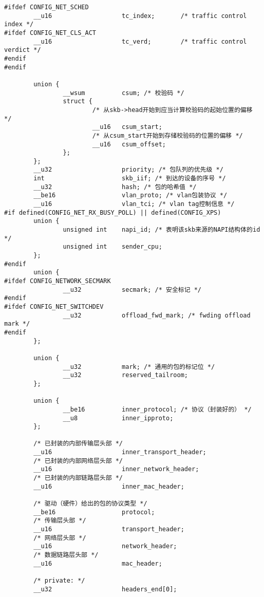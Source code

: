 \documentclass[11pt, a4paper,oneside]{book}
\theoremstyle{ocrenumbox}
\theoremstyle{purplenumbox}
\theoremstyle{blackbox}
\begin{document}
\begin{verbatim}
#ifdef CONFIG_NET_SCHED
        __u16                   tc_index;       /* traffic control index */
#ifdef CONFIG_NET_CLS_ACT
        __u16                   tc_verd;        /* traffic control verdict */
#endif
#endif

        union {
                __wsum          csum; /* 校验码 */
                struct {
                        /* 从skb->head开始到应当计算校验码的起始位置的偏移 */
                        __u16   csum_start; 
                        /* 从csum_start开始到存储校验码的位置的偏移 */
                        __u16   csum_offset;
                };
        };
        __u32                   priority; /* 包队列的优先级 */
        int                     skb_iif; /* 到达的设备的序号 */
        __u32                   hash; /* 包的哈希值 */
        __be16                  vlan_proto; /* vlan包装协议 */
        __u16                   vlan_tci; /* vlan tag控制信息 */
#if defined(CONFIG_NET_RX_BUSY_POLL) || defined(CONFIG_XPS)
        union {
                unsigned int    napi_id; /* 表明该skb来源的NAPI结构体的id */
                unsigned int    sender_cpu;
        };
#endif
        union {
#ifdef CONFIG_NETWORK_SECMARK
                __u32           secmark; /* 安全标记 */
#endif
#ifdef CONFIG_NET_SWITCHDEV
                __u32           offload_fwd_mark; /* fwding offload mark */
#endif
        };

        union {
                __u32           mark; /* 通用的包的标记位 */
                __u32           reserved_tailroom;
        };

        union {
                __be16          inner_protocol; /* 协议（封装好的） */
                __u8            inner_ipproto;
        };

        /* 已封装的内部传输层头部 */
        __u16                   inner_transport_header; 
        /* 已封装的内部网络层头部 */
        __u16                   inner_network_header; 
        /* 已封装的内部链路层头部 */
        __u16                   inner_mac_header;

        /* 驱动（硬件）给出的包的协议类型 */
        __be16                  protocol;
        /* 传输层头部 */
        __u16                   transport_header;
        /* 网络层头部 */
        __u16                   network_header;
        /* 数据链路层头部 */
        __u16                   mac_header;

        /* private: */
        __u32                   headers_end[0];
\end{verbatim}
\end{document}
